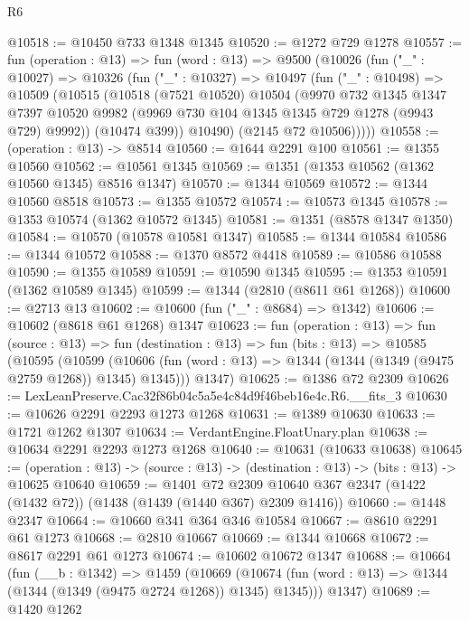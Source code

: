 \begin{lexlean}{R6}
\begin{coremodule}
@10518 := @10450 @733 @1348 @1345
@10520 := @1272 @729 @1278
@10557 := fun (operation : @13) =>
  fun (word : @13) =>
  @9500
    (@10026
      (fun ("_" : @10027) =>
      @10326
        (fun ("_" : @10327) =>
        @10497
          (fun ("_" : @10498) =>
          @10509
            (@10515
              (@10518
                (@7521 @10520)
                @10504
                (@9970
                  @732
                  @1345
                  @1347
                  @7397
                  @10520
                  @9982
                  (@9969 @730 @104 @1345 @1345 @729 @1278 (@9943 @729) @9992))
                (@10474 @399))
              @10490)
            (@2145 @72 @10506)))))
@10558 := (operation : @13) -> @8514
@10560 := @1644 @2291 @100
@10561 := @1355 @10560
@10562 := @10561 @1345
@10569 := @1351 (@1353 @10562 (@1362 @10560 @1345) @8516 @1347)
@10570 := @1344 @10569
@10572 := @1344 @10560 @8518
@10573 := @1355 @10572
@10574 := @10573 @1345
@10578 := @1353 @10574 (@1362 @10572 @1345)
@10581 := @1351 (@8578 @1347 @1350)
@10584 := @10570 (@10578 @10581 @1347)
@10585 := @1344 @10584
@10586 := @1344 @10572
@10588 := @1370 @8572 @4418
@10589 := @10586 @10588
@10590 := @1355 @10589
@10591 := @10590 @1345
@10595 := @1353 @10591 (@1362 @10589 @1345)
@10599 := @1344 (@2810 (@8611 @61 @1268))
@10600 := @2713 @13
@10602 := @10600 (fun ("_" : @8684) => @1342)
@10606 := @10602 (@8618 @61 @1268) @1347
@10623 := fun (operation : @13) =>
  fun (source : @13) =>
  fun (destination : @13) =>
  fun (bits : @13) =>
  @10585
    (@10595
      (@10599 (@10606 (fun (word : @13) => @1344 (@1344 (@1349 (@9475 @2759 @1268)) @1345) @1345)))
      @1347)
@10625 := @1386 @72 @2309
@10626 := LexLeanPreserve.Cac32f86b04c5a5e4c84d9f46beb16e4c.R6.__fits_3
@10630 := @10626 @2291 @2293 @1273 @1268
@10631 := @1389 @10630
@10633 := @1721 @1262 @1307
@10634 := VerdantEngine.FloatUnary.plan
@10638 := @10634 @2291 @2293 @1273 @1268
@10640 := @10631 (@10633 @10638)
@10645 := (operation : @13) ->
  (source : @13) -> (destination : @13) -> (bits : @13) -> @10625 @10640
@10659 := @1401
    @72
    @2309
    @10640
    @367
    @2347
    (@1422 (@1432 @72))
    (@1438 (@1439 (@1440 @367) @2309 @1416))
@10660 := @1448 @2347
@10664 := @10660 @341 @364 @346 @10584
@10667 := @8610 @2291 @61 @1273
@10668 := @2810 @10667
@10669 := @1344 @10668
@10672 := @8617 @2291 @61 @1273
@10674 := @10602 @10672 @1347
@10688 := @10664
    (fun (__b : @1342) =>
    @1459
      (@10669 (@10674 (fun (word : @13) => @1344 (@1344 (@1349 (@9475 @2724 @1268)) @1345) @1345)))
      @1347)
@10689 := @1420 @1262

\end{coremodule}
\end{lexlean}
